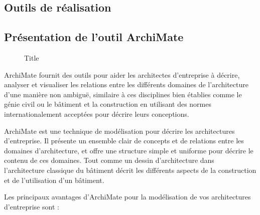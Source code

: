 \documentclass[a4paper]{report}
\begin{document}
\begin{doublespace}
\chapter{Outils de réalisation}
\fancyhead[L]{\hspace*{5cm}}

\section{Présentation de l'outil ArchiMate}

\begin{figure}[H] 
	\begin{center}
		\caption{Title}
	\end{center}
\end{figure}

ArchiMate fournit des outils pour aider les architectes d'entreprise à
décrire, analyser et visualiser les relations entre les différents
domaines de l'architecture d'une manière non ambiguë, similaire à ces
disciplines bien établies comme le génie civil ou le bâtiment et la
construction en utilisant des normes internationalement acceptées pour
décrire leurs conceptions.

ArchiMate est une technique de modélisation pour décrire les
architectures d'entreprise. Il présente un ensemble clair de concepts et
de relations entre les domaines d'architecture, et offre une structure
simple et uniforme pour décrire le contenu de ces domaines. Tout comme
un dessin d'architecture dans l'architecture classique du bâtiment
décrit les différents aspects de la construction et de l'utilisation
d'un bâtiment.

Les principaux avantages d'ArchiMate pour la modélisation de vos
architectures d'entreprise sont :


\end{doublespace}
\end{document}
